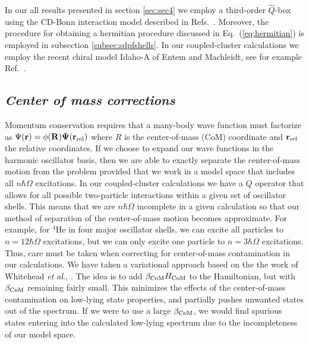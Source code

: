 \documentclass[twoside,12pt]{article}
\begin{document}
In our all results presented in section \ref{sec:sec4} we employ a 
third-order $\hat{Q}$-box using the CD-Bonn interaction model described in
Refs.~\cite{cdbonn,cdbonn2000}. Moreover, the procedure for obtaining a
hermitian procedure discussed in Eq.~(\ref{eq:hermitian}) is employed in
subsection \ref{subsec:sdpfshells}. In our coupled-cluster calculations we employ the 
recent chiral model Idaho-A of Entem and Machleidt, see for example Ref.~\cite{machleidt02}. 


\subsection{\it Center of mass corrections}

Momentum conservation requires 
that a many-body wave function must factorize
as $\Psi(\bf{r}) = \phi(R)\Psi(\bf{r}_{\rm rel})$ where 
$R$ is the center-of-mass (CoM) coordinate and $\bf{r}_{\rm rel}$ the 
relative coordinates. If we choose to expand our wave functions in
the harmonic oscillator basis, then we are able to exactly separate the
center-of-mass motion from the problem provided that we work in a model
space that includes all $n\hbar\Omega$ excitations. 
In our coupled-cluster calculations we have a $Q$ operator that allows 
for all possible two-particle interactions within a given 
set of oscillator shells.  This means that we are 
$n\hbar\Omega$ incomplete in a given 
calculation so that our method of separation of the center-of-mass 
motion becomes approximate. For example, for $^4$He in four major oscillator
shells, we can excite all particles to $n=12\hbar\Omega$ excitations, 
but we can only excite one particle to $n=3\hbar\Omega$ excitations. 
Thus, care must be taken when correcting for center-of-mass contamination
in our calculations. We have taken a variational approach based on the 
the work of Whitehead {\em et al.}, \cite{whit77}. The idea is 
to add $\beta_{\rm CoM}H_{\rm CoM}$ to the Hamiltonian, but 
with $\beta_{\rm CoM}$ remaining fairly
small. This minimizes the effects of the center-of-mass contamination on
low-lying state properties, and partially pushes unwanted states out of the
spectrum. If we were to use a large $\beta_{\rm CoM}$, we would find 
spurious states entering into the calculated low-lying spectrum due to 
the incompleteness of our model space. 
\end{document}
